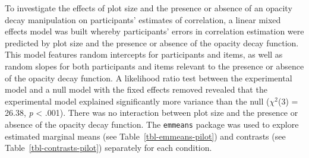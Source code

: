 \documentclass[../main.tex]{subfiles}
\begin{document}
To investigate the effects of plot size and the presence or absence of
an opacity decay manipulation on participants' estimates of correlation,
a linear mixed effects model was built whereby participants' errors in
correlation estimation were predicted by plot size and the presence or
absence of the opacity decay function. This model features random
intercepts for participants and items, as well as random slopes for both
participants and items relevant to the presence or absence of the
opacity decay function. A likelihood ratio test between the experimental
model and a null model with the fixed effects removed revealed that the
experimental model explained significantly more variance than the null
(\(\chi^2\)(3) = 26.38, \emph{p} \textless{} .001). There was no
interaction between plot size and the presence or absence of the opacity
decay function. The \texttt{emmeans} \cite{lenth_2024} package was used
to explore estimated marginal means (see Table~\ref{tbl-emmeans-pilot})
and contrasts (see Table~\ref{tbl-contrasts-pilot}) separately for each
condition.

\begin{table}

\caption{\label{tbl-emmeans-pilot}Estimated Marginal Means (EMMs) of
correlation estimation error for plot size (a) and the presence of the
opacity decay function (b) in the pilot study.}

\begin{minipage}{0.50\linewidth}



\end{minipage}%
%
\begin{minipage}{0.50\linewidth}



\end{minipage}%

\end{table}%
\end{document}
